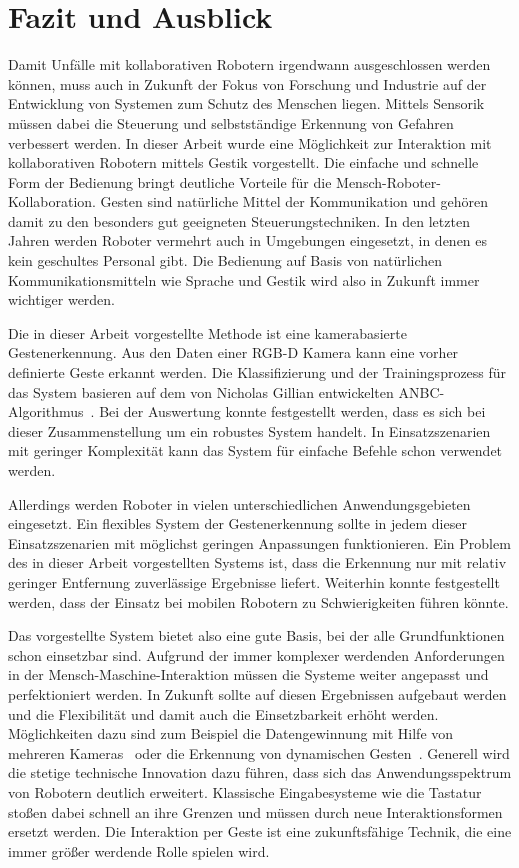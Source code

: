 \chapter{Fazit und Ausblick}
Damit Unfälle mit kollaborativen Robotern irgendwann ausgeschlossen werden können, muss auch in Zukunft der Fokus von Forschung und Industrie auf der Entwicklung von Systemen zum Schutz des Menschen liegen. Mittels Sensorik müssen dabei die Steuerung und selbstständige Erkennung von Gefahren verbessert werden. In dieser Arbeit wurde eine Möglichkeit zur Interaktion mit kollaborativen Robotern mittels Gestik vorgestellt. Die einfache und schnelle Form der Bedienung bringt deutliche Vorteile für die Mensch-Roboter-Kollaboration. Gesten sind natürliche Mittel der Kommunikation und gehören damit zu den besonders gut geeigneten Steuerungstechniken. In den letzten Jahren werden Roboter vermehrt auch in Umgebungen eingesetzt, in denen es kein geschultes Personal gibt. Die Bedienung auf Basis von natürlichen Kommunikationsmitteln wie Sprache und Gestik wird also in Zukunft immer wichtiger werden. 

Die in dieser Arbeit vorgestellte Methode ist eine kamerabasierte Gestenerkennung. Aus den Daten einer RGB-D Kamera kann eine vorher definierte Geste erkannt werden. Die Klassifizierung und der Trainingsprozess für das System basieren auf dem von Nicholas Gillian entwickelten ANBC-Algorithmus~\cite{gillianANBC}. Bei der Auswertung konnte festgestellt werden, dass es sich bei dieser Zusammenstellung um ein robustes System handelt. In Einsatzszenarien mit geringer Komplexität kann das System für einfache Befehle schon verwendet werden.

Allerdings werden Roboter in vielen unterschiedlichen Anwendungsgebieten eingesetzt. Ein flexibles System der Gestenerkennung sollte in jedem dieser Einsatzszenarien mit möglichst geringen Anpassungen funktionieren. Ein Problem des in dieser Arbeit vorgestellten Systems ist, dass die Erkennung nur mit relativ geringer Entfernung zuverlässige Ergebnisse liefert. Weiterhin konnte festgestellt werden, dass der Einsatz bei mobilen Robotern zu Schwierigkeiten führen könnte.

Das vorgestellte System bietet also eine gute Basis, bei der alle Grundfunktionen schon einsetzbar sind. Aufgrund der immer komplexer werdenden Anforderungen in der Mensch-Maschine-Interaktion müssen die Systeme weiter angepasst und perfektioniert werden. In Zukunft sollte auf diesen Ergebnissen aufgebaut werden und die Flexibilität und damit auch die Einsetzbarkeit erhöht werden. Möglichkeiten dazu sind zum Beispiel die Datengewinnung mit Hilfe von mehreren Kameras~\cite{multipleDepthCameras} oder die Erkennung von dynamischen Gesten~\cite{hiddenMarkov}. Generell wird die stetige technische Innovation dazu führen, dass sich das Anwendungsspektrum von Robotern deutlich erweitert. Klassische Eingabesysteme wie die Tastatur stoßen dabei schnell an ihre Grenzen und müssen durch neue Interaktionsformen ersetzt werden. Die Interaktion per Geste ist eine zukunftsfähige Technik, die eine immer größer werdende Rolle spielen wird.  

 